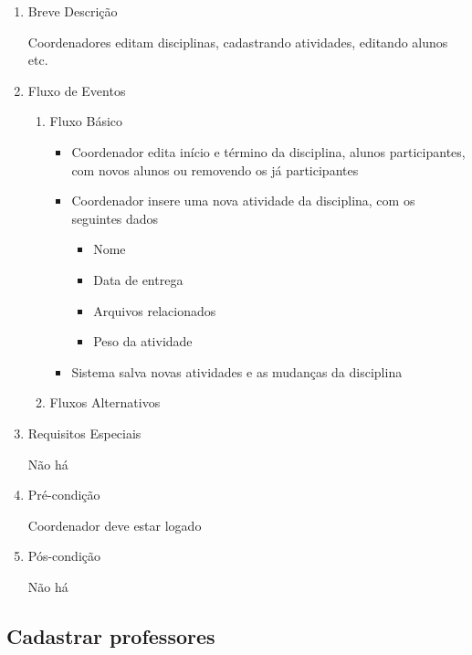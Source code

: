\begin{enumerate}
    \item Breve Descrição


Coordenadores editam disciplinas, cadastrando atividades, editando alunos etc.


    \item Fluxo de Eventos

\begin{enumerate}
    \item Fluxo Básico

\begin{itemize}
    \item Coordenador edita início e término da disciplina, alunos participantes, com novos alunos ou removendo os já participantes

    \item Coordenador insere uma nova atividade da disciplina, com os seguintes dados

\begin{itemize}
    \item Nome

    \item Data de entrega

    \item Arquivos relacionados

    \item Peso da atividade


\end{itemize}
    \item Sistema salva novas atividades e as mudanças da disciplina
\end{itemize}

    \item Fluxos Alternativos



\end{enumerate}
    \item Requisitos Especiais


Não há


    \item Pré-condição


Coordenador deve estar logado


    \item Pós-condição

    Não há
\end{enumerate}

\subsection{Cadastrar professores}


